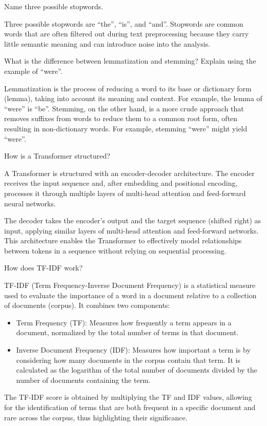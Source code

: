 \begin{ejercicio}
    Name three possible stopwords.

    Three possible stopwords are ``the'', ``is'', and ``and''. Stopwords are common words that are often filtered out during text preprocessing because they carry little semantic meaning and can introduce noise into the analysis.
\end{ejercicio}

\begin{ejercicio}
    What is the difference between lemmatization and stemming? Explain using the example of ``were''.

    Lemmatization is the process of reducing a word to its base or dictionary form (lemma), taking into account its meaning and context. For example, the lemma of ``were'' is ``be''. Stemming, on the other hand, is a more crude approach that removes suffixes from words to reduce them to a common root form, often resulting in non-dictionary words. For example, stemming ``were'' might yield ``were''.
\end{ejercicio}

\begin{ejercicio}
    How is a Transformer structured?

    A Transformer is structured with an encoder-decoder architecture. The encoder receives the input sequence and, after embedding and positional encoding, processes it through multiple layers of multi-head attention and feed-forward neural networks.
    
    The decoder takes the encoder's output and the target sequence (shifted right) as input, applying similar layers of multi-head attention and feed-forward networks. This architecture enables the Transformer to effectively model relationships between tokens in a sequence without relying on sequential processing.
\end{ejercicio}

\begin{ejercicio}
    How does TF-IDF work?

    TF-IDF (Term Frequency-Inverse Document Frequency) is a statistical measure used to evaluate the importance of a word in a document relative to a collection of documents (corpus). It combines two components:
    \begin{itemize}
        \item Term Frequency (TF): Measures how frequently a term appears in a document, normalized by the total number of terms in that document.
        \item Inverse Document Frequency (IDF): Measures how important a term is by considering how many documents in the corpus contain that term. It is calculated as the logarithm of the total number of documents divided by the number of documents containing the term.
    \end{itemize}
    The TF-IDF score is obtained by multiplying the TF and IDF values, allowing for the identification of terms that are both frequent in a specific document and rare across the corpus, thus highlighting their significance.
\end{ejercicio}

